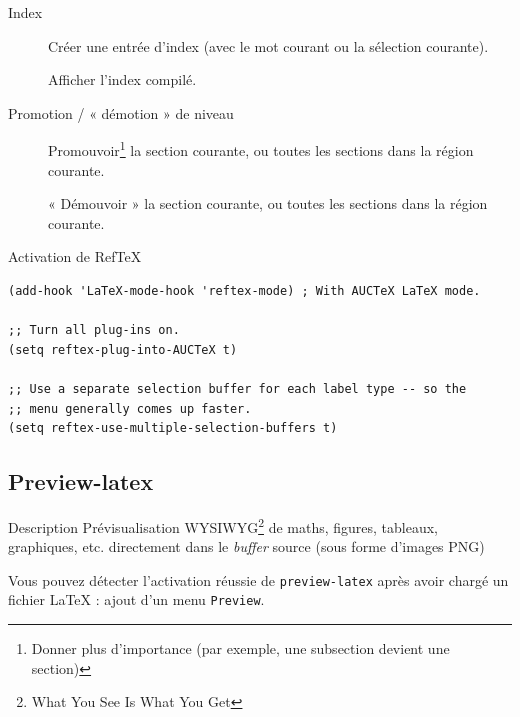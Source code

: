 \documentclass[t]{beamer}
\let\ORIkeys\keys
\renewcommand{\keys}[1]{\ORIkeys{\texttt{#1}}}
\newcommand{\repeatedkeys}[1]{\keys{\textcolor{gray}{#1}}}
\begin{document}
\begin{frame}[label={sec:org08adf61}]{Index}
\begin{description}
\item[{\keys{C-c} \keys{/}}] Créer une entrée d'index (avec le mot courant ou la sélection courante).
\end{description}

\begin{description}
\item[{\repeatedkeys{C-c} \keys{>}}] Afficher l'index compilé.
\end{description}
\end{frame}

\begin{frame}[label={sec:orgf1004c8}]{Promotion / « démotion » de niveau}
\begin{description}
\item[{\keys{<}}] Promouvoir\footnote{Donner plus d'importance (par exemple, une subsection
devient une section)} la section courante, ou toutes les sections dans la
région courante.

\item[{\keys{>}}] « Démouvoir » la section courante, ou toutes les sections dans la région
courante.
\end{description}
\end{frame}

\begin{frame}[fragile,label={sec:orgd9fe0f7}]{Activation de RefTeX}
 \lstset{language=Lisp,label= ,caption= ,captionpos=b,numbers=none}
\begin{lstlisting}
(add-hook 'LaTeX-mode-hook 'reftex-mode) ; With AUCTeX LaTeX mode.

;; Turn all plug-ins on.
(setq reftex-plug-into-AUCTeX t)

;; Use a separate selection buffer for each label type -- so the
;; menu generally comes up faster.
(setq reftex-use-multiple-selection-buffers t)
\end{lstlisting}
\end{frame}

\subsection{Preview-latex}
\label{sec:org977f133}

\begin{frame}[fragile,label={sec:orgd2700a6}]{Description}
 Prévisualisation WYSIWYG\footnote{What You See Is What You Get} de maths, figures,
tableaux, graphiques, etc. directement dans le \emph{buffer} source (sous forme
d'images PNG)

Vous pouvez détecter l'\alert{activation} réussie de \texttt{preview-latex} après avoir chargé
un fichier \LaTeX{} : ajout d'un menu \texttt{Preview}.
\end{frame}
\end{document}
